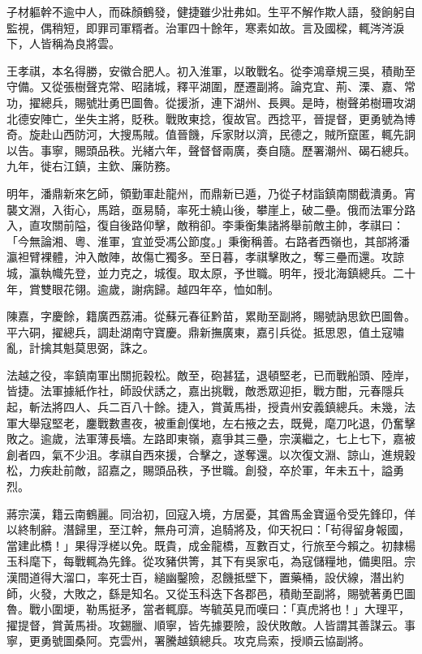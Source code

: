 \begin{pinyinscope}
子材軀幹不逾中人，而硃顏鶴發，健捷雖少壯弗如。生平不解作欺人語，發餉躬自監視，偶稍短，即罪司軍糈者。治軍四十餘年，寒素如故。言及國樑，輒涔涔淚下，人皆稱為良將雲。

王孝祺，本名得勝，安徽合肥人。初入淮軍，以敢戰名。從李鴻章規三吳，積勛至守備。又從張樹聲克常、昭諸城，釋平湖圍，歷遷副將。論克宜、荊、溧、嘉、常功，擢總兵，賜號壯勇巴圖魯。從援浙，連下湖州、長興。是時，樹聲弟樹珊攻湖北德安陣亡，坐失主將，貶秩。戰敗東捻，復故官。西捻平，晉提督，更勇號為博奇。旋赴山西防河，大搜馬賊。值晉饑，斥家財以濟，民德之，賊所竄匿，輒先詗以告。事寧，賜頭品秩。光緒六年，聲督督兩廣，奏自隨。歷署潮州、碣石總兵。九年，徙右江鎮，主欽、廉防務。

明年，潘鼎新來乞師，領勤軍赴龍州，而鼎新已遁，乃從子材詣鎮南關截潰勇。宵襲文淵，入街心，馬踣，亟易騎，率死士繞山後，攀崖上，破二壘。俄而法軍分路入，直攻關前隘，復自後路仰擊，敵稍卻。李秉衡集諸將舉前敵主帥，孝祺曰：「今無論湘、粵、淮軍，宜並受馮公節度。」秉衡稱善。右路者西嶺也，其部將潘瀛袒臂裸體，沖入敵陣，故傷亡獨多。至日暮，孝祺擊敗之，奪三壘而還。攻諒城，瀛執幟先登，並力克之，城復。取太原，予世職。明年，授北海鎮總兵。二十年，賞雙眼花翎。逾歲，謝病歸。越四年卒，恤如制。

陳嘉，字慶餘，籍廣西荔浦。從蘇元春征黔苗，累勛至副將，賜號訥思欽巴圖魯。平六硐，擢總兵，調赴湖南守寶慶。鼎新撫廣東，嘉引兵從。抵思恩，值土寇嘯亂，計擒其魁莫思弼，誅之。

法越之役，率鎮南軍出關扼穀松。敵至，砲甚猛，退頓堅老，已而戰船頭、陸岸，皆捷。法軍據紙作社，師設伏誘之，嘉出挑戰，敵悉眾迎拒，戰方酣，元春隱兵起，斬法將四人、兵二百八十餘。捷入，賞黃馬褂，授貴州安義鎮總兵。未幾，法軍大舉寇堅老，鏖戰數晝夜，被重創僕地，左右掖之去，既覺，麾刀叱退，仍奮擊敗之。逾歲，法軍薄長墻。左路即東嶺，嘉爭其三壘，宗漢繼之，七上七下，嘉被創者四，氣不少沮。孝祺自西來援，合擊之，遂奪還。以次復文淵、諒山，進規穀松，力疾赴前敵，詔嘉之，賜頭品秩，予世職。創發，卒於軍，年未五十，謚勇烈。

蔣宗漢，籍云南鶴麗。同治初，回寇入境，方居憂，其酋馬金寶逼令受先鋒印，佯以終制辭。潛歸里，至江幹，無舟可濟，追騎將及，仰天祝曰：「茍得留身報國，當建此橋！」果得浮槎以免。既貴，成金龍橋，亙數百丈，行旅至今賴之。初隸楊玉科麾下，每戰輒為先鋒。從攻豬供箐，其下有吳家屯，為寇儲糧地，備奧阻。宗漢間道得大溜口，率死士百，縋幽鑿險，忍饑抵壁下，置藥桶，設伏線，潛出約師，火發，大敗之，繇是知名。又從玉科迭下各郡邑，積勛至副將，賜號著勇巴圖魯。戰小圍埂，勒馬挺矛，當者輒靡。岑毓英見而嘆曰：「真虎將也！」大理平，擢提督，賞黃馬褂。攻錫臘、順寧，皆先據要險，設伏敗敵。人皆謂其善謀云。事寧，更勇號圖桑阿。克雲州，署騰越鎮總兵。攻克烏索，授順云協副將。


\end{pinyinscope}
